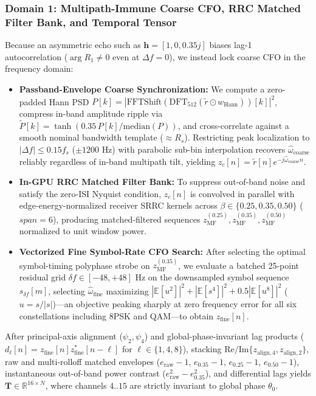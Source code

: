 \subsubsection{Domain 1: Multipath-Immune Coarse CFO, RRC Matched Filter Bank, and Temporal Tensor}
Because an asymmetric echo such as $\mathbf{h} = [1, 0, 0.35j]$ biases lag-1 autocorrelation ($\arg R_1 \neq 0$ even at $\Delta f = 0$), we instead lock coarse CFO in the frequency domain:
\begin{itemize}
    \item \textbf{Passband-Envelope Coarse Synchronization:} We compute a zero-padded Hann PSD $P[k] = |\text{FFTShift}(\text{DFT}_{512}(\tilde{r} \odot w_{\text{Hann}}))[k]|^2$, compress in-band amplitude ripple via $\tilde{P}[k] = \tanh(0.35\,P[k]/\text{median}(P))$, and cross-correlate against a smooth nominal bandwidth template ($\approx R_s$). Restricting peak localization to $|\Delta f| \le 0.15 f_s$ ($\pm 1200\text{ Hz}$) with parabolic sub-bin interpolation recovers $\hat{\omega}_{\text{coarse}}$ reliably regardless of in-band multipath tilt, yielding $z_c[n] = \tilde{r}[n] e^{-j\hat{\omega}_{\text{coarse}} n}$.
    \item \textbf{In-GPU RRC Matched Filter Bank:} To suppress out-of-band noise and satisfy the zero-ISI Nyquist condition, $z_c[n]$ is convolved in parallel with edge-energy-normalized receiver SRRC kernels across $\beta \in \{0.25, 0.35, 0.50\}$ ($span=6$), producing matched-filtered sequences $z_{\text{MF}}^{(0.25)}, z_{\text{MF}}^{(0.35)}, z_{\text{MF}}^{(0.50)}$ normalized to unit window power.
    \item \textbf{Vectorized Fine Symbol-Rate CFO Search:} After selecting the optimal symbol-timing polyphase strobe on $z_{\text{MF}}^{(0.35)}$, we evaluate a batched 25-point residual grid $\delta f \in [-48, +48]\text{ Hz}$ on the downsampled symbol sequence $s_{\delta f}[m]$, selecting $\hat{\omega}_{\text{fine}}$ maximizing $|\mathbb{E}[u^2]|^2 + |\mathbb{E}[s^4]|^2 + 0.5|\mathbb{E}[u^8]|^2$ ($u = s/|s|$)—an objective peaking sharply at zero frequency error for all six constellations including 8PSK and QAM—to obtain $z_{\text{fine}}[n]$.
\end{itemize}
After principal-axis alignment ($\psi_2, \psi_4$) and global-phase-invariant lag products ($d_\ell[n] = z_{\text{fine}}[n] z_{\text{fine}}^*[n-\ell]$ for $\ell \in \{1, 4, 8\}$), stacking $\text{Re}/\text{Im}\{z_{\text{align},4}, z_{\text{align},2}\}$, raw and multi-rolloff matched envelopes ($e_{\text{raw}}-1$, $e_{0.35}-1$, $e_{0.25}-1$, $e_{0.50}-1$), instantaneous out-of-band power contrast ($e_{\text{raw}}^2 - e_{0.35}^2$), and differential lags yields $\mathbf{T} \in \mathbb{R}^{16 \times N}$, where channels $4..15$ are strictly invariant to global phase $\theta_0$.


